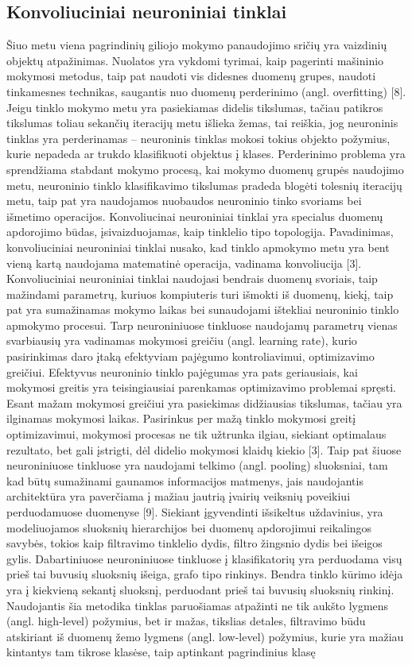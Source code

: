 \documentclass{VUMIFInfBakalaurinis}
\begin{document}
\subsection{Konvoliuciniai neuroniniai tinklai}
Šiuo metu viena pagrindinių giliojo mokymo panaudojimo sričių yra vaizdinių objektų atpažinimas. Nuolatos yra vykdomi tyrimai, kaip pagerinti mašininio mokymosi metodus, taip pat naudoti vis didesnes duomenų grupes, naudoti tinkamesnes technikas, saugantis nuo duomenų perderinimo (angl. overfitting) [8]. Jeigu tinklo mokymo metu yra pasiekiamas didelis tikslumas, tačiau patikros tikslumas toliau sekančių iteracijų metu išlieka žemas, tai reiškia, jog neuroninis tinklas yra perderinamas – neuroninis tinklas mokosi tokius objekto požymius, kurie nepadeda ar trukdo klasifikuoti objektus į klases. Perderinimo problema yra sprendžiama stabdant mokymo procesą, kai mokymo duomenų grupės naudojimo metu, neuroninio tinklo klasifikavimo tikslumas pradeda blogėti tolesnių iteracijų metu, taip pat yra naudojamos nuobaudos neuroninio tinko svoriams bei išmetimo operacijos. Konvoliucinai neuroniniai tinklai yra specialus duomenų apdorojimo būdas, įsivaizduojamas, kaip tinklelio tipo topologija. Pavadinimas, konvoliuciniai neuroniniai tinklai nusako, kad tinklo apmokymo metu yra bent vieną kartą naudojama matematinė operacija, vadinama konvoliucija [3]. Konvoliuciniai neuroniniai tinklai naudojasi bendrais duomenų svoriais, taip mažindami parametrų, kuriuos kompiuteris turi išmokti iš duomenų, kiekį, taip pat yra sumažinamas mokymo laikas bei sunaudojami ištekliai neuroninio tinklo apmokymo procesui. Tarp neuroniniuose tinkluose naudojamų parametrų vienas svarbiausių yra vadinamas mokymosi greičiu (angl. learning rate), kurio pasirinkimas daro įtaką efektyviam pajėgumo kontroliavimui, optimizavimo greičiui. Efektyvus neuroninio tinklo pajėgumas yra pats geriausiais, kai mokymosi greitis yra teisingiausiai parenkamas optimizavimo problemai spręsti. Esant mažam mokymosi greičiui yra pasiekimas didžiausias tikslumas, tačiau yra ilginamas mokymosi laikas. Pasirinkus per mažą tinklo mokymosi greitį optimizavimui, mokymosi procesas ne tik užtrunka ilgiau, siekiant optimalaus rezultato, bet gali įstrigti, dėl didelio mokymosi klaidų kiekio [3]. Taip pat šiuose neuroniniuose tinkluose yra naudojami telkimo (angl. pooling) sluoksniai, tam kad būtų sumažinami gaunamos informacijos matmenys, jais naudojantis architektūra yra paverčiama į mažiau jautrią įvairių veiksnių poveikiui perduodamuose duomenyse [9]. Siekiant įgyvendinti išsikeltus uždavinius, yra modeliuojamos sluoksnių hierarchijos bei duomenų apdorojimui reikalingos savybės, tokios kaip filtravimo tinklelio dydis, filtro žingsnio dydis bei išeigos gylis. Dabartiniuose neuroniniuose tinkluose į klasifikatorių yra perduodama visų prieš tai buvusių sluoksnių išeiga, grafo tipo rinkinys. Bendra tinklo kūrimo idėja yra į kiekvieną sekantį sluoksnį, perduodant prieš tai buvusių sluoksnių rinkinį. Naudojantis šia metodika tinklas paruošiamas atpažinti ne tik aukšto lygmens (angl. high-level) požymius, bet ir mažas, tikslias detales, filtravimo būdu atskiriant iš duomenų žemo lygmens (angl. low-level) požymius, kurie yra mažiau kintantys tam tikrose klasėse, taip aptinkant pagrindinius klasę 
\end{document}

